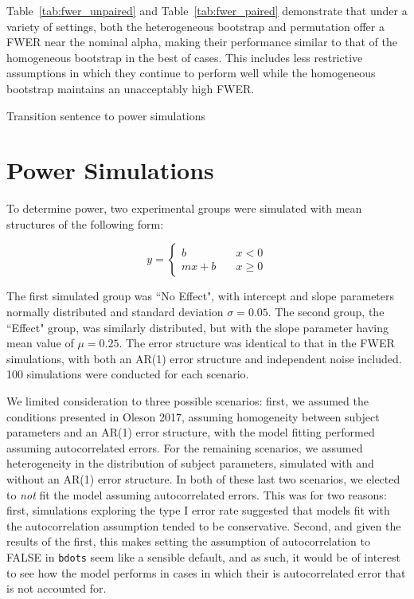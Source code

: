 \documentclass{article}
\newcommand{\xt}{\texttt}
\begin{document}
Table~\ref{tab:fwer_unpaired} and Table~\ref{tab:fwer_paired} demonstrate that under a variety of settings, both the heterogeneous bootstrap and permutation offer a FWER near the nominal alpha, making their performance similar to that of the homogeneous bootstrap in the best of cases. This includes less restrictive assumptions in which they continue to perform well while the homogeneous bootstrap maintains an unacceptably high FWER. 

Transition sentence to power simulations

\section{Power Simulations}


To determine power, two experimental groups were simulated with mean structures of the following form:

\begin{equation}\label{eq:piecewise_form}
y = \begin{cases}
b \quad &x < 0 \\
mx + b \quad &x \geq 0
\end{cases}
\end{equation}

The first simulated group was ``No Effect", with intercept and slope parameters normally distributed and standard deviation $\sigma = 0.05$. The second group, the ``Effect" group, was similarly distributed, but with the slope parameter having mean value of $\mu = 0.25$. The error structure was identical to that in the FWER simulations, with both an AR(1) error structure and independent noise included. 100 simulations were conducted for each scenario. 

We limited consideration to three possible scenarios: first, we assumed the conditions presented in Oleson 2017, assuming homogeneity between subject parameters and an AR(1) error structure, with the model fitting performed assuming autocorrelated errors. For the remaining scenarios, we assumed heterogeneity in the distribution of subject parameters, simulated with and without an AR(1) error structure. In both of these last two scenarios, we elected to \textit{not} fit the model assuming autocorrelated errors. This was for two reasons: first, simulations exploring the type I error rate suggested that models fit with the autocorrelation assumption tended to be conservative. Second, and given the results of the first, this makes setting the assumption of autocorrelation to FALSE in \xt{bdots} seem like a sensible default, and as such, it would be of interest to see how the model performs in cases in which their is autocorrelated error that is not accounted for.
\end{document}

